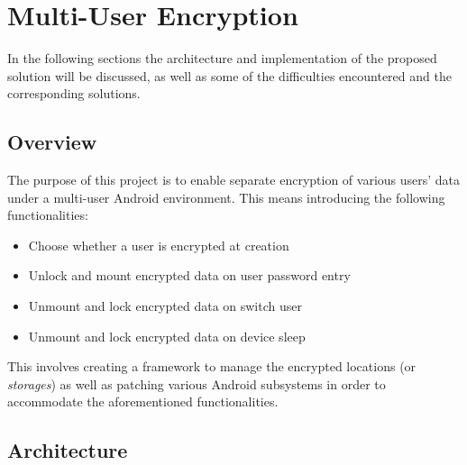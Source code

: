 \chapter{Multi-User Encryption}
\label{chapter:multi-user}

In the following sections the architecture and implementation of the proposed solution will be discussed, as well as some of the difficulties encountered and the corresponding solutions.

\section{Overview}
\label{sec:over-multi-user}

The purpose of this project is to enable separate encryption of various users' data under a multi-user Android environment. This means introducing the following functionalities:
\begin{itemize}
\item Choose whether a user is encrypted at creation
\item Unlock and mount encrypted data on user password entry
\item Unmount and lock encrypted data on switch user
\item Unmount and lock encrypted data on device sleep
\end{itemize}

This involves creating a framework to manage the encrypted locations (or \textit{storages}) as well as patching various Android subsystems in order to accommodate the aforementioned functionalities.

\section{Architecture}
\label{sec:arch-multi-user}

